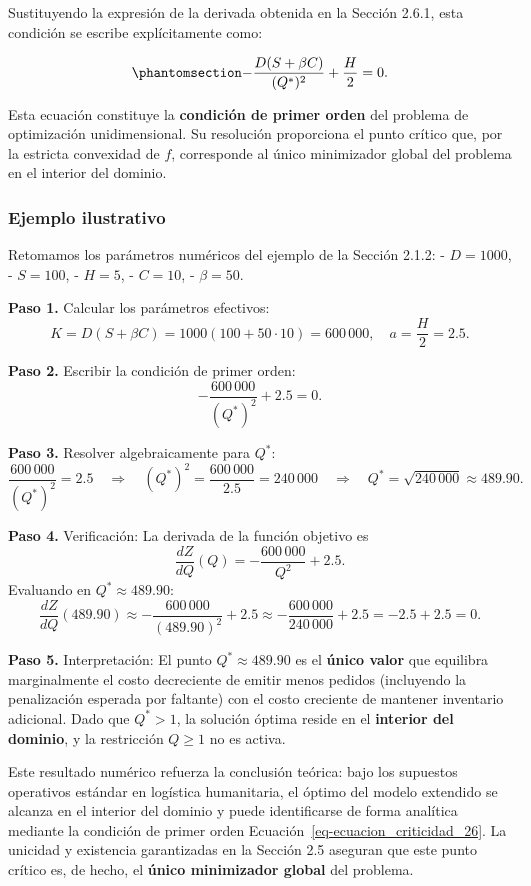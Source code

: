 \documentclass[
  spanish,
  us-letterpaper,
  DIV=11,
  numbers=noendperiod]{scrreprt}
\numberwithin{equation}{section}
\begin{document}
Sustituyendo la expresión de la derivada obtenida en la Sección 2.6.1,
esta condición se escribe explícitamente como:

\begin{equation}\phantomsection\label{eq-ecuacion_criticidad_26}{
-\frac{D(S + \beta C)}{(Q^*)^2} + \frac{H}{2} = 0.
}\end{equation}

Esta ecuación constituye la \textbf{condición de primer orden} del
problema de optimización unidimensional. Su resolución proporciona el
punto crítico que, por la estricta convexidad de \(f\), corresponde al
único minimizador global del problema en el interior del dominio.

\subsubsection{Ejemplo ilustrativo}\label{ejemplo-ilustrativo-5}

Retomamos los parámetros numéricos del ejemplo de la Sección 2.1.2: -
\(D = 1000\), - \(S = 100\), - \(H = 5\), - \(C = 10\), -
\(\beta = 50\).

\textbf{Paso 1.} Calcular los parámetros efectivos: \[
K = D(S + \beta C) = 1000(100 + 50 \cdot 10) = 600\,000, \quad
a = \frac{H}{2} = 2.5.
\]

\textbf{Paso 2.} Escribir la condición de primer orden: \[
-\frac{600\,000}{(Q^*)^2} + 2.5 = 0.
\]

\textbf{Paso 3.} Resolver algebraicamente para \(Q^*\): \[
\frac{600\,000}{(Q^*)^2} = 2.5
\quad\Longrightarrow\quad
(Q^*)^2 = \frac{600\,000}{2.5} = 240\,000
\quad\Longrightarrow\quad
Q^* = \sqrt{240\,000} \approx 489.90.
\]

\textbf{Paso 4.} Verificación: La derivada de la función objetivo es \[
\frac{dZ}{dQ}(Q) = -\frac{600\,000}{Q^2} + 2.5.
\] Evaluando en \(Q^* \approx 489.90\): \[
\frac{dZ}{dQ}(489.90) \approx -\frac{600\,000}{(489.90)^2} + 2.5 \approx -\frac{600\,000}{240\,000} + 2.5 = -2.5 + 2.5 = 0.
\]

\textbf{Paso 5.} Interpretación: El punto \(Q^* \approx 489.90\) es el
\textbf{único valor} que equilibra marginalmente el costo decreciente de
emitir menos pedidos (incluyendo la penalización esperada por faltante)
con el costo creciente de mantener inventario adicional. Dado que
\(Q^* > 1\), la solución óptima reside en el \textbf{interior del
dominio}, y la restricción \(Q \geq 1\) no es activa.

Este resultado numérico refuerza la conclusión teórica: bajo los
supuestos operativos estándar en logística humanitaria, el óptimo del
modelo extendido se alcanza en el interior del dominio y puede
identificarse de forma analítica mediante la condición de primer orden
Ecuación~\ref{eq-ecuacion_criticidad_26}. La unicidad y existencia
garantizadas en la Sección 2.5 aseguran que este punto crítico es, de
hecho, el \textbf{único minimizador global} del problema.
\end{document}
